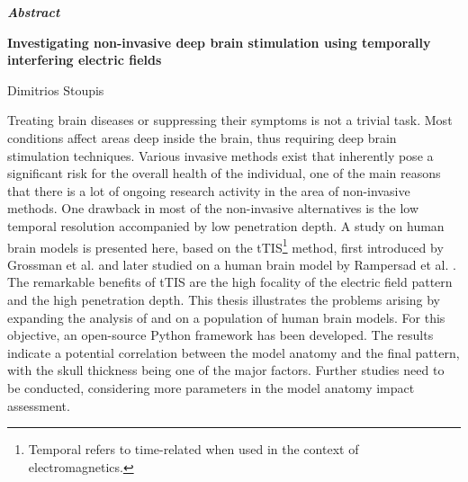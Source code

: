 \thispagestyle{plain}
\vspace*{\fill}
\begin{center}
    \LARGE
    \textit{\textbf{Abstract}}
        
    \vspace{0.4cm}
    \large
    \textbf{Investigating non-invasive deep brain stimulation using temporally interfering electric fields}
        
    \vspace{0.4cm}
    Dimitrios Stoupis
\end{center}
\normalsize

\vspace{0.9cm}
Treating brain diseases or suppressing their symptoms is not a trivial task. Most conditions affect areas deep inside the brain, thus requiring deep brain stimulation techniques. Various invasive methods exist that inherently pose a significant risk for the overall health of the individual, one of the main reasons that there is a lot of ongoing research activity in the area of non-invasive methods. One drawback in most of the non-invasive alternatives is the low temporal resolution accompanied by low penetration depth. A study on human brain models \cite{ErikG.Lee2016} is presented here, based on the \gls{tTIS}\footnote{Temporal refers to time-related when used in the context of electromagnetics.} method, first introduced by Grossman et al. \cite{Grossman2017} and later studied on a human brain model by Rampersad et al. \cite{Rampersad2019}. The remarkable benefits of \gls{tTIS} are the high focality of the electric field pattern and the high penetration depth. This thesis illustrates the problems arising by expanding the analysis of  and  on a population of human brain models. For this objective, an open-source Python framework \cite{thesis_repo} has been developed. The results indicate a potential correlation between the model anatomy and the final pattern, with the skull thickness being one of the major factors. Further studies need to be conducted, considering more parameters in the model anatomy impact assessment.
\vspace*{\fill}
